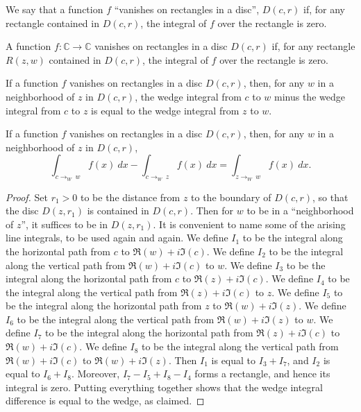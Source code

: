 We say that a function $f$ ``vanishes on rectangles in a disc'', $D(c,r)$ if, for any rectangle
contained in $D(c,r)$, the integral of $f$ over the rectangle is zero.
\begin{definition}
  \label{VanishesOnRectanglesInDisc}
  \leanok
  A function $f:\mathbb C\to\mathbb C$ vanishes on rectangles in a disc $D(c,r)$ if, for any
  rectangle $R(z,w)$ contained in $D(c,r)$, the integral of $f$ over the rectangle is zero.
\end{definition}


If a function $f$ vanishes on rectangles in a disc $D(c,r)$, then, for any $w$ in a neighborhood
of $z$ in $D(c,r)$, the wedge integral from $c$ to $w$ minus the wedge integral from $c$ to $z$
is equal to the wedge integral from $z$ to $w$.
\begin{lemma}
  \label{diff_of_wedges}
  \leanok
  If a function $f$ vanishes on rectangles in a disc $D(c,r)$, then, for any $w$ in a
  neighborhood of $z$ in $D(c,r)$,
  $$
    \int_{c\to_W\  w} f(x)\ dx
    -
    \int_{c\to_W\  z} f(x)\ dx
    =
    \int_{z\to_W\  w} f(x)\ dx
    .
  $$
\end{lemma}

 \begin{proof}
 Set $r_1>0$ to be the distance from $z$ to the boundary of $D(c,r)$,
 so that the disc $D(z,r_1)$ is contained in $D(c,r)$.
 Then for $w$ to be in a ``neighborhood of $z$'', it suffices to be in $D(z,r_1)$.
 It is convenient to name some of the arising line integrals, to be used again and again.
 We define $I_1$ to be the integral along the horizontal path from $c$ to $\Re(w)+i\Im(c)$.
 We define $I_2$ to be the integral along the vertical path from $\Re(w)+i\Im(c)$ to $w$.
 We define $I_3$ to be the integral along the horizontal path from $c$ to $\Re(z)+i\Im(c)$.
 We define $I_4$ to be the integral along the vertical path from $\Re(z)+i\Im(c)$ to $z$.
 We define $I_5$ to be the integral along the horizontal path from $z$ to $\Re(w)+i\Im(z)$.
 We define $I_6$ to be the integral along the vertical path from $\Re(w)+i\Im(z)$ to $w$.
 We define $I_7$ to be the integral along the horizontal path from $\Re(z)+i\Im(c)$ to
 $\Re(w)+i\Im(c)$.
 We define $I_8$ to be the integral along the vertical path from $\Re(w)+i\Im(c)$ to
 $\Re(w)+i\Im(z)$.
 Then $I_1$ is equal to $I_3+I_7$,
 and $I_2$ is equal to $I_6+I_8$.
 Moreover, $I_7 - I_5 + I_8 - I_4$ forms a rectangle, and hence its integral is zero.
 Putting everything together shows that the wedge integral difference is equal to the wedge,
 as claimed.
 \end{proof}

